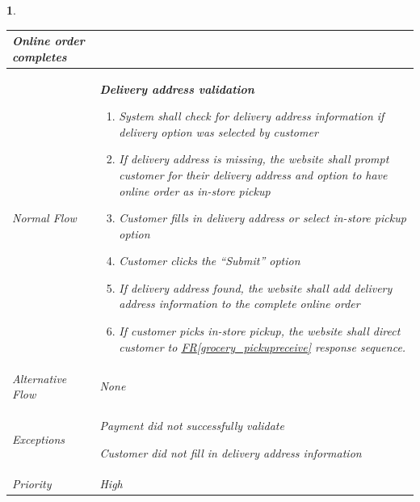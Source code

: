 \documentclass{scrreprt}
\theoremstyle{funreq}
\newtheorem{funreq}{}
\newcommand*{\reqref}[1]{\hyperref[#1]{FR\ref*{#1}}}
\begin{document}
\begin{funreq}
\begin{table}[H]
{\begin{tabularx}{\columnwidth}{|l|X|}
					
                    Online order completes
					\\ \hline Normal Flow &
					\bfseries{Delivery address validation}\normalfont\newline 
					\begin{enumerate}
					    \item System shall check for delivery address information if delivery option was selected by customer
					    \item If delivery address is missing, the website shall prompt customer for their delivery address and option to have online order as in-store pickup
                        \item Customer fills in delivery address or select in-store pickup option
                        \item Customer clicks the “Submit” option
                        \item If delivery address found, the website shall add delivery address information to the complete online order
                        \item If customer picks in-store pickup, the website shall direct customer to \reqref{grocery_pickupreceive} response sequence.
					\end{enumerate}
					\\ \hline Alternative Flow & 
					None
					\\ \hline Exceptions & Payment did not successfully validate
                        
                        Customer did not fill in delivery address information
					\\ \hline Priority & 
					High
					\\ \hline
				\end{tabularx}%
			}
		\end{table}
	\end{funreq}
	
\end{document}
